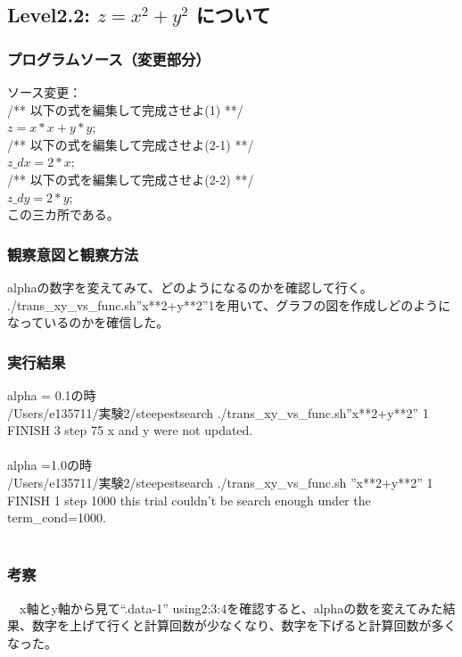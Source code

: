 \subsection{Level2.2: $z=x^2 + y^2$ について}
\subsubsection{プログラムソース（変更部分）}
ソース変更：\\
/** 以下の式を編集して完成させよ(1) **/\\
 $ z = x*x + y*y$;\\
/** 以下の式を編集して完成させよ(2-1) **/\\
$z\_dx = 2*x$;\\
/** 以下の式を編集して完成させよ(2-2) **/\\
$z\_dy = 2*y$;\\
この三カ所である。\\
\subsubsection{観察意図と観察方法}
alphaの数字を変えてみて、どのようになるのかを確認して行く。\\
./trans\_xy\_vs\_func.sh''x**2+y**2''1を用いて、グラフの図を作成しどのようになっているのかを確信した。\\
\subsubsection{実行結果}
alpha = 0.1の時\\
/Users/e135711/実験2/steepestsearch ./trans\_xy\_vs\_func.sh''x**2+y**2'' 1\\
FINISH 3 step 75 x and y were not updated.\\
\\
alpha =1.0の時\\
/Users/e135711/実験2/steepestsearch ./trans\_xy\_vs\_func.sh ''x**2+y**2'' 1\\
FINISH 1 step 1000 this trial couldn't be search enough under the term\_cond=1000.\\
\\
\subsubsection{考察}
　x軸とy軸から見て“.data-1” using2:3:4を確認すると、alphaの数を変えてみた結果、数字を上げて行くと計算回数が少なくなり、数字を下げると計算回数が多くなった。\\

